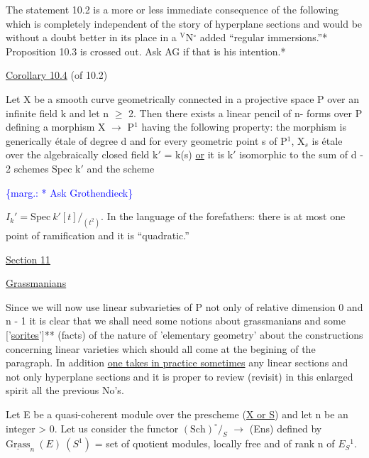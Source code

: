 \documentclass[11pt]{article}
\newcommand{\scanpage}[1]{\par\bigskip\noindent{\small\sffamily[scan #1]}\par}
\newcommand{\mspage}[1]{{\small\sffamily[p.\,#1]}}
\newcommand{\margin}[1]{\textcolor{blue}{\{\textsf{marg.:} #1\}}}
\newcommand{\uline}[1]{\underline{#1}}
\begin{document}
The statement 10.2 is a more or less immediate consequence of
the following which is completely independent of the story of
hyperplane sections and would be without a doubt better in its
place in a ${}^{\mathrm{V}}$N$^{\circ}$ added ``regular immersions.''*
Proposition 10.3 is crossed out.  Ask AG if that is his
intention.*

\uline{Corollary 10.4} (of 10.2)

Let X be a smooth curve geometrically connected in a
projective space P over an infinite field k and let n $\geq$ 2.  Then
there exists a linear pencil of n- forms over P defining a
morphism X $\to$ P$^1$ having the following property:  the morphism is
generically étale of degree d and for every geometric point s of
P$^1$, X$_s$ is étale over the algebraically closed field k$'$ = k(s) \uline{or} it
is k$'$ isomorphic to the sum of d - 2 schemes Spec k$'$ and the scheme

\margin{* Ask Grothendieck}

\clearpage
\scanpage{24/71}
\mspage{71}

$I_k{}' = \mathrm{Spec}\ k'[t]/_{(t^2)}$.  In the language of the forefathers:  there
is at most one point of ramification and it is ``quadratic.''

\uline{Section 11}

\uline{Grassmanians}

Since we will now use linear subvarieties of P not only of
relative dimension 0 and n - 1 it is clear that we shall need some
notions about grassmanians and some ['\uline{sorites}']** (facts) of the
nature of 'elementary geometry' about the constructions concerning
linear varieties which should all come at the begining of the
paragraph.  In addition \uline{one takes in practice sometimes} any linear
sections and not only hyperplane sections and it is proper to
review (revisit) in this enlarged spirit all the previous No's.

Let E be a quasi-coherent module over the prescheme (\uline{X or S})
and let n be an integer > 0.  Let us consider the functor $(\mathrm{Sch})^{\circ}/_S$
$\rightarrow$ (Ens) defined by $\underline{\mathrm{Grass}}_n\ (E)\ (S^1)$ = set of quotient modules,
locally free and of rank n of $E_S{}^1$.
\end{document}
